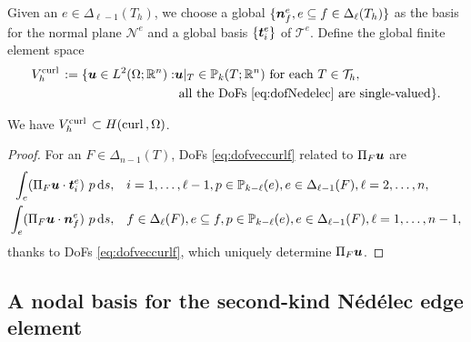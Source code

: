 \documentclass[mathpazo]{cicp}
\begin{document}
Given an $e\in \Delta_{\ell-1}(T_h)$, we choose a global $\{\boldsymbol n_{f}^e, e\subseteq f\in\Delta_{\ell}(T_h)\}$ as the basis for the normal plane $\mathscr N^e$ and a global basis $\{\boldsymbol t_i^e\}$ of $\mathscr T^e$. 
 Define the global finite element space
\begin{align*}
V_h^{{\rm curl\,}}:=\{\boldsymbol u\in L^2(\Omega;\mathbb R^n): &\boldsymbol u|_T\in\mathbb P_k(T; \mathbb R^n) \textrm{ for each } T\in\mathcal T_h, \\
 &\textrm{ all the DoFs \eqref{eq:dofNedelec} are single-valued}\}.
\end{align*}

\begin{lemma}
We have $V_h^{{\rm curl\,}}\subset H({\rm curl\,},\Omega)$.
\end{lemma}
\begin{proof}
For an $F\in\Delta_{n-1}(T)$, DoFs \eqref{eq:dofveccurlf} related to $\Pi_F\boldsymbol u$ are
\begin{align*}
\int_e (\Pi_F\boldsymbol u\cdot \boldsymbol t_i^e)\ p \,{\rm d} s,& \quad i=1,\ldots, \ell-1, p\in \mathbb P_{k - \ell} (e), e\in \Delta_{\ell-1}(F), \ell = 2,\ldots, n,\\
\int_e (\Pi_F\boldsymbol u\cdot \boldsymbol n_{f}^e)\ p \,{\rm d} s, &\quad f\in\Delta_{\ell}(F), e\subseteq f, p\in \mathbb P_{k - \ell} (e), e\in \Delta_{\ell-1}(F), \ell = 1,\ldots, n-1,
\end{align*}
thanks to DoFs \eqref{eq:dofveccurlf}, which uniquely determine $\Pi_F\boldsymbol u$.
\end{proof}


\subsection{A nodal basis for the second-kind N\'ed\'elec edge element}

\end{document}
